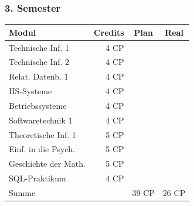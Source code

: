 \begin{multicols}{2}
\subsubsection*{3. Semester}
{
\footnotesize
\begin{tabular}{|l|r|c|c|}
\hline \textbf{Modul}		& \textbf{Credits} 	& \textbf{Plan} & \textbf{Real} \\ 
\hline
\hline Technische Inf. 1 	& 4 CP 				& \nx 			& 	 	\\ 
\hline Technische Inf. 2 	& 4 CP 				& \nx 			& \nx	\\ 
\hline Relat. Datenb. 1 	& 4 CP 				& \nx 			& 	 	\\ 
\hline HS-Systeme 			& 4 CP 				& \nx 			& \nx	\\ 
\hline Betriebssysteme 		& 4 CP 				& \nx 			& 	 	\\ 
\hline Softwaretechnik 1 	& 4 CP 				& \nx 			& \nx	\\ 
\hline Theoretische Inf. 1 	& 5 CP 				& \nx 			& \nx 	\\ 
\hline Einf. in die Psych. 	& 5 CP 				& \nx 			& 	 	\\ 
\hline Geschichte der Math. & 5 CP 				& \nx 			& \nx	\\ 
\hline SQL-Praktikum		& 4 CP 				& 	 			& \nx 	\\ 
\hline
\hline Summe 				&  					& 39 CP 		& 26 CP \\ 
\hline 
\end{tabular}
}


\end{multicols}
